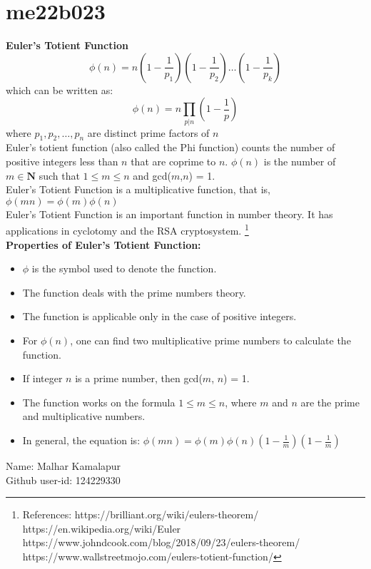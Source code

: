 \section{me22b023}
\textbf{Euler's Totient Function}
\[\phi(n) = n\left(1 - \frac{1}{p_1}\right)\left(1 - \frac{1}{p_2}\right)\ldots\left(1 - \frac{1}{p_k}\right)\]
which can be written as:
\[\phi(n) = n\prod_{p|n}\left(1 - \frac{1}{p}\right)\]
where $p_1,p_2,\ldots,p_n$ are distinct prime factors of $n$ \\
Euler's totient function (also called the Phi function) counts the number of positive integers less than $n$ that are coprime to $n$. $\phi(n)$ is the number of $m \in \mathbf{N}$ such that $1 \le m \le n$ and gcd($m$,$n$) = 1. \\
Euler's Totient Function is a multiplicative function, that is, $\phi(mn) = \phi(m)\phi(n)$ \\
Euler's Totient Function is an important function in number theory. It has applications in cyclotomy and the RSA cryptosystem.
\footnote{
References: 
https://brilliant.org/wiki/eulers-theorem/ \\
https://en.wikipedia.org/wiki/Euler \\
https://www.johndcook.com/blog/2018/09/23/eulers-theorem/ \\
https://www.wallstreetmojo.com/eulers-totient-function/
} \\ 
\textbf{Properties of Euler's Totient Function:}
\begin{itemize}
\item $\phi$ is the symbol used to denote the function.
\item The function deals with the prime numbers theory.
\item The function is applicable only in the case of positive integers.
\item For $\phi(n)$, one can find two multiplicative prime numbers to calculate the function.
\item If integer $n$ is a prime number, then gcd($m$, $n$) = 1.
\item The function works on the formula $1 \le m \le n$, where $m$ and $n$ are the prime and multiplicative numbers.
\item In general, the equation is: 
$\phi(mn) = \phi(m)\phi(n)\left(1 - \frac{1}{m}\right)\left(1 - \frac{1}{m}\right)$

\end{itemize}

Name: Malhar Kamalapur \\
Github user-id: 124229330
